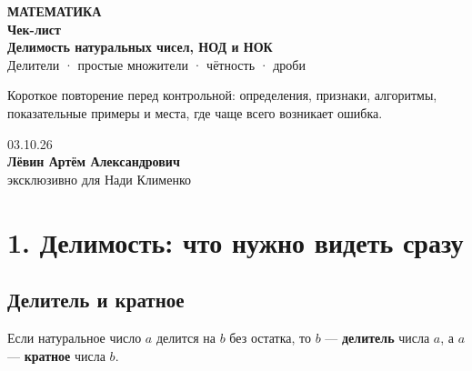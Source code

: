 \documentclass[a4paper,12pt]{article}
\newcommand{\key}[1]{\textbf{\color{darkaccent}#1}}
\begin{document}
\begin{titlepage}
\thispagestyle{empty}
\centering
\vspace*{22mm}

{\large\color{accent}\textbf{МАТЕМАТИКА}}\\[10mm]
{\fontsize{30}{34}\selectfont\bfseries\color{darkaccent}Чек-лист}\\[4mm]
{\LARGE\bfseries Делимость натуральных чисел, НОД и НОК}\\[5mm]
{\large Делители · простые множители · чётность · дроби}\\[16mm]

\begin{minipage}{0.78\textwidth}
\centering
\large
Короткое повторение перед контрольной: определения, признаки, алгоритмы, показательные примеры и места, где чаще всего возникает ошибка.
\end{minipage}

\vfill
{\large 03.10.26}\\[8mm]
{\normalsize\bfseries Лёвин Артём Александрович}\\[2mm]
{\normalsize эксклюзивно для Нади Клименко}

\vspace{15mm}
\end{titlepage}

\section{1. Делимость: что нужно видеть сразу}

\subsection{Делитель и кратное}
Если натуральное число $a$ делится на $b$ без остатка, то $b$ --- \key{делитель} числа $a$, а $a$ --- \key{кратное} числа $b$.
\end{document}
